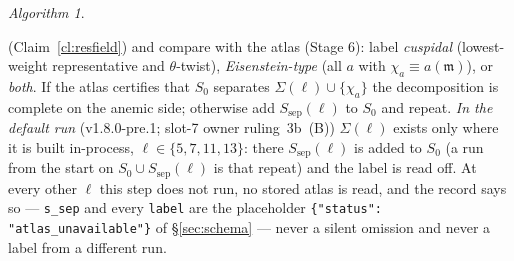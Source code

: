 \documentclass[11pt]{article}
\theoremstyle{remark}
\newtheorem{algorithm}[theorem]{Algorithm}
\newcommand{\m}{\mathfrak{m}}
\begin{document}
\begin{algorithm}
\begin{enumerate}
  (Claim~\ref{cl:resfield}) and
  compare with the atlas (Stage 6): label \emph{cuspidal} (lowest-weight representative and
  $\theta$-twist), \emph{Eisenstein-type} (all $a$ with $\chi_a\equiv a(\m)$), or \emph{both}.
  If the atlas certifies that $S_0$ separates $\Sigma(\ell)\cup\{\chi_a\}$ the decomposition is
  complete on the anemic side; otherwise add $S_{\mathrm{sep}}(\ell)$ to $S_0$ and repeat.
  \emph{In the default run} (v1.8.0-pre.1; slot-7 owner ruling~3b~(B)) $\Sigma(\ell)$ exists
  only where it is built in-process, $\ell\in\{5,7,11,13\}$: there $S_{\mathrm{sep}}(\ell)$ is
  added to $S_0$ (a run from the start on $S_0\cup S_{\mathrm{sep}}(\ell)$ is that repeat) and
  the label is read off. At every other $\ell$ this step does not run, no stored atlas is read,
  and the record says so --- \texttt{s\_sep} and every \texttt{label} are the placeholder
  \texttt{\{"status": "atlas\_unavailable"\}} of \S\ref{sec:schema} --- never a silent
  omission and never a label from a different run.
\end{enumerate}
\end{algorithm}
\end{document}
